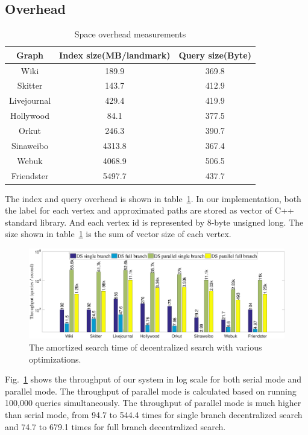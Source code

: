 \subsection{Overhead}
\label{eval_overhead}

\begin{table}
		\caption{Space overhead measurements}
    \label{table:ioh}
    \centering
    \begin{tabular}{c|cc} \hline
				Graph&Index size(MB/landmark)&Query size(Byte)\\ \hline
				Wiki&189.9&369.8 \\ 
				Skitter&143.7&412.9 \\ 
				Livejournal&429.4&419.9 \\ 
				Hollywood&84.1&377.5 \\ 
				Orkut&246.3&390.7 \\ 
				Sinaweibo&4313.8&367.4 \\ 
				Webuk&4068.9&506.5 \\ 
				Friendster&5497.7&437.7 \\ \hline
    \end{tabular}
\end{table}

The index and query overhead is shown in table~\ref{table:ioh}. In our implementation, both the label for each vertex and approximated paths are stored as vector of C++ standard library. And each vertex id is represented by 8-byte unsigned long. The size shown in table~\ref{table:ioh} is the sum of vector size of each vertex. 

\begin{figure}[t]
    \centering
    \includegraphics[width=0.95\linewidth]{./figures/throughput.pdf}
    \caption{The amortized search time of decentralized search with various optimizations.}
    \label{fig:throughput}
\end{figure}

Fig.~\ref{fig:throughput} shows the throughput of our system in log scale for both serial mode and parallel mode. The throughput of parallel mode is calculated based on running 100,000 queries simultaneously. The throughput of parallel mode is much higher than serial mode, from 94.7 to 544.4 times for single branch decentralized search and 74.7 to 679.1 times for full branch decentralized search. 

